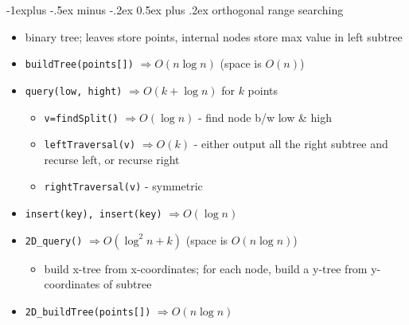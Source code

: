 \documentclass[10pt, landscape]{article}
\makeatletter
\renewcommand{\subsection}{\@startsection{subsection}{2}{0mm}%
                                {-1explus -.5ex minus -.2ex}%
                                {0.5ex plus .2ex}%
                                {\normalfont\normalsize\bfseries}}
\let\Then\Rightarrow
\newcommand{\code}[1]{\textcolor{myblue}{\texttt{#1}}}
\makeatother
\begin{document}
\begin{multicols}{4}
\subsection{orthogonal range searching}
\begin{itemize}
    \item binary tree; leaves store points, internal nodes store max value in left subtree
    \item \code{buildTree(points[])} $\Then O(n \log n)$ \quad (space is $O(n)$)
    \item \code{query(low, hight)} $\Then O(k + \log n)$ for $k$ points
    \begin{itemize}
        \item \code{v=findSplit()} $\Then O(\log n)$ - find node b/w low \& high
        \item \code{leftTraversal(v)} $\Then O(k)$ - either output all the right subtree and recurse left, or recurse right 
        \item \code{rightTraversal(v)} - symmetric
    \end{itemize}
    \item \code{insert(key), insert(key)} $\Then O(\log n)$ 
    \item \code{2D\_query()} $\Then O(\log^2n + k)$ \quad (space is $O(n \log n)$)
    \begin{itemize}
        \item build x-tree from x-coordinates; for each node, build a y-tree from y-coordinates of subtree
    \end{itemize}
    \item \code{2D\_buildTree(points[])} $\Then O(n \log n)$
\end{itemize}


\end{multicols}
\end{document}
